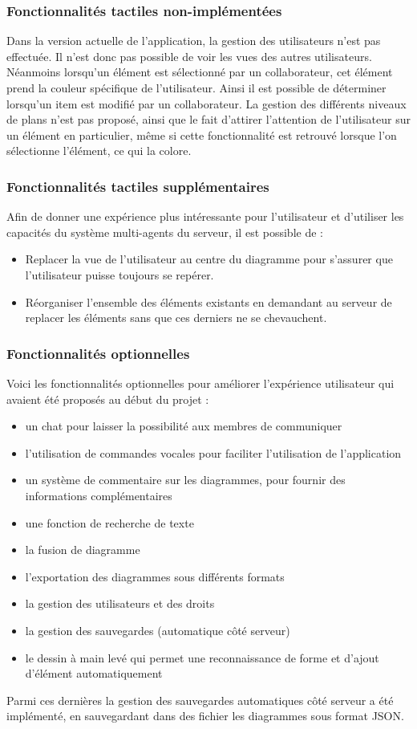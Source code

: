 \subsubsection{Fonctionnalités tactiles non-implémentées}
Dans la version actuelle de l'application, la gestion des utilisateurs n'est pas effectuée.
Il n'est donc pas possible de voir les vues des autres utilisateurs.
Néanmoins lorsqu'un élément est sélectionné par un collaborateur, cet élément prend la couleur spécifique de l'utilisateur.
Ainsi il est possible de déterminer lorsqu'un item est modifié par un collaborateur. 
La gestion des différents niveaux de plans n'est pas proposé, ainsi que le fait d'attirer l'attention de l'utilisateur sur un élément en particulier, même si cette fonctionnalité est retrouvé lorsque l'on sélectionne l'élément, ce qui la colore. 

\subsubsection{Fonctionnalités tactiles supplémentaires}
Afin de donner une expérience plus intéressante pour l'utilisateur et d'utiliser les capacités du système multi-agents du serveur, il est possible de :
\begin{itemize}
	\item Replacer la vue de l'utilisateur au centre du diagramme pour s'assurer que l'utilisateur puisse toujours se repérer.
	\item Réorganiser l'ensemble des éléments existants en demandant au serveur de replacer les éléments sans que ces derniers ne se chevauchent.
\end{itemize}

\subsubsection{Fonctionnalités optionnelles}
Voici les fonctionnalités optionnelles pour améliorer l'expérience utilisateur qui avaient été proposés au début du projet :
\begin{itemize}
\item un chat pour laisser la possibilité aux membres de communiquer
\item l'utilisation de commandes vocales pour faciliter l'utilisation de l'application
\item un système de commentaire sur les diagrammes, pour fournir des informations complémentaires
\item une fonction de recherche de texte
\item la fusion de diagramme
\item l'exportation des diagrammes sous différents formats
\item la gestion des utilisateurs et des droits
\item la gestion des sauvegardes (automatique côté serveur)
\item le dessin à main levé qui permet une reconnaissance de forme et d'ajout d'élément automatiquement
\end{itemize}
Parmi ces dernières la gestion des sauvegardes automatiques côté serveur a été implémenté, en sauvegardant dans des fichier les diagrammes sous format JSON.

